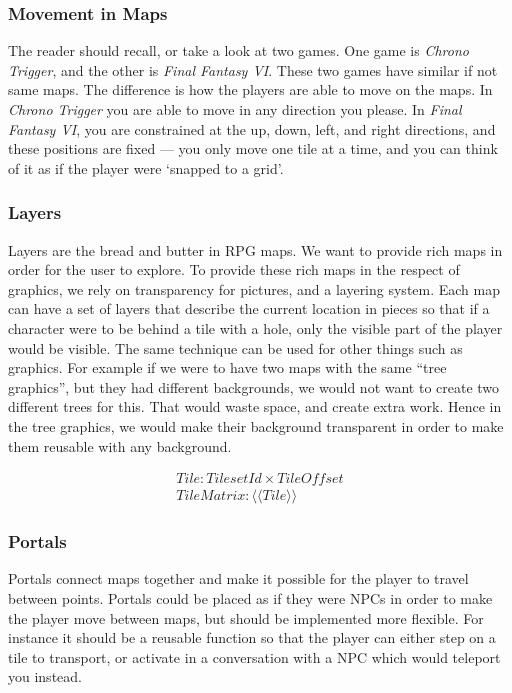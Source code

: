 \subsubsection{Movement in Maps}

The reader should recall, or take a look at two games. One game is
\textit{Chrono Trigger}, and the other is \textit{Final Fantasy VI}. These two
games have similar if not same maps. The difference is how the players are able
to move on the maps. In \textit{Chrono Trigger} you are able to move in any
direction you please. In \textit{Final Fantasy VI}, you are constrained at the
up, down, left, and right directions, and these positions are fixed --- you only
move one tile at a time, and you can think of it as if the player were `snapped
to a grid'.

\subsubsection{Layers}

Layers are the bread and butter in RPG maps. We want to provide rich maps in
order for the user to explore. To provide these rich maps in the respect of
graphics, we rely on transparency for pictures, and a layering system. Each
map can have a set of layers that describe the current location in pieces so
that if a character were to be behind a tile with a hole, only the visible part
of the player would be visible. The same technique can be used for other things
such as graphics. For example if we were to have two maps with the same ``tree
graphics'', but they had different backgrounds, we would not want to create two
different trees for this. That would waste space, and create extra work. Hence
in the tree graphics, we would make their background transparent in order to
make them reusable with any background.

\begin{equation}
\begin{split}
Tile\colon TilesetId \times TileOffset \\
TileMatrix\colon \langle \langle Tile \rangle \rangle
\end{split}
\end{equation}

\subsubsection{Portals}

Portals connect maps together and make it possible for the player to travel
between points. Portals could be placed as if they were NPCs in order to make
the player move between maps, but should be implemented more flexible. For
instance it should be a reusable function so that the player can either step
on a tile to transport, or activate in a conversation with a NPC which would
teleport you instead.

